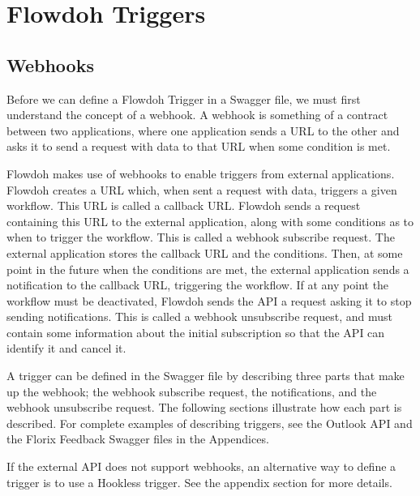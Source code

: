\section{Flowdoh Triggers}
\label{sec:triggers}
\subsection{Webhooks}
Before we can define a Flowdoh Trigger in a Swagger file, we must first understand the concept of a webhook. A webhook is something of a contract between two applications, where one application sends a URL to the other and asks it to send a request with data to that URL when some condition is met. 

Flowdoh makes use of webhooks to enable triggers from external applications. Flowdoh creates a URL which, when sent a request with data, triggers a given workflow. This URL is called a callback URL. Flowdoh sends a request containing this URL to the external application, along with some conditions as to when to trigger the workflow. This is called a webhook subscribe request. The external application stores the callback URL and the conditions. Then, at some point in the future when the conditions are met, the external application sends a notification to the callback URL, triggering the workflow. If at any point the workflow must be deactivated, Flowdoh sends the API a request asking it to stop sending notifications. This is called a webhook unsubscribe request, and must contain some information about the initial subscription so that the API can identify it and cancel it.

A trigger can be defined in the Swagger file by describing three parts that make up the webhook; the webhook subscribe request, the notifications, and the webhook unsubscribe request. The following sections illustrate how each part is described. For complete examples of describing triggers, see the Outlook API and the Florix Feedback Swagger files in the Appendices.

If the external API does not support webhooks, an alternative way to define a trigger is to use a Hookless trigger. See the appendix section for more details.

